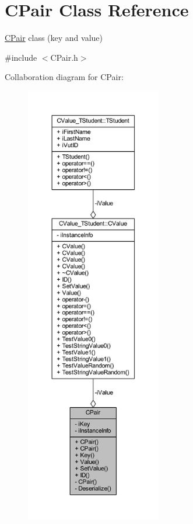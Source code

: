 \hypertarget{class_c_pair}{}\section{C\+Pair Class Reference}
\label{class_c_pair}


\hyperlink{class_c_pair}{C\+Pair} class (key and value)  




{\ttfamily \#include $<$C\+Pair.\+h$>$}



Collaboration diagram for C\+Pair\+:
\nopagebreak
\begin{figure}[H]
\begin{center}
\leavevmode
\includegraphics[height=550pt]{class_c_pair__coll__graph}
\end{center}
\end{figure}
